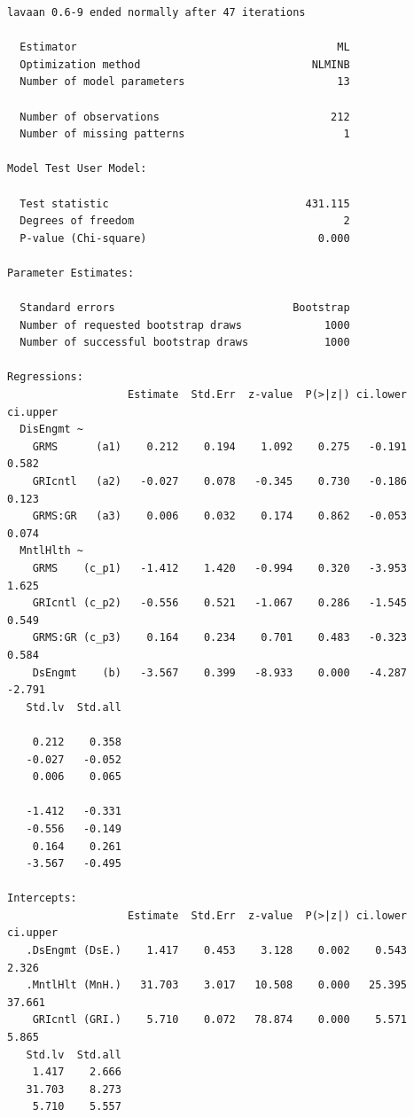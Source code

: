 \documentclass[
]{book}
\begin{document}
\begin{verbatim}
lavaan 0.6-9 ended normally after 47 iterations

  Estimator                                         ML
  Optimization method                           NLMINB
  Number of model parameters                        13
                                                      
  Number of observations                           212
  Number of missing patterns                         1
                                                      
Model Test User Model:
                                                      
  Test statistic                               431.115
  Degrees of freedom                                 2
  P-value (Chi-square)                           0.000

Parameter Estimates:

  Standard errors                            Bootstrap
  Number of requested bootstrap draws             1000
  Number of successful bootstrap draws            1000

Regressions:
                   Estimate  Std.Err  z-value  P(>|z|) ci.lower ci.upper
  DisEngmt ~                                                            
    GRMS      (a1)    0.212    0.194    1.092    0.275   -0.191    0.582
    GRIcntl   (a2)   -0.027    0.078   -0.345    0.730   -0.186    0.123
    GRMS:GR   (a3)    0.006    0.032    0.174    0.862   -0.053    0.074
  MntlHlth ~                                                            
    GRMS    (c_p1)   -1.412    1.420   -0.994    0.320   -3.953    1.625
    GRIcntl (c_p2)   -0.556    0.521   -1.067    0.286   -1.545    0.549
    GRMS:GR (c_p3)    0.164    0.234    0.701    0.483   -0.323    0.584
    DsEngmt    (b)   -3.567    0.399   -8.933    0.000   -4.287   -2.791
   Std.lv  Std.all
                  
    0.212    0.358
   -0.027   -0.052
    0.006    0.065
                  
   -1.412   -0.331
   -0.556   -0.149
    0.164    0.261
   -3.567   -0.495

Intercepts:
                   Estimate  Std.Err  z-value  P(>|z|) ci.lower ci.upper
   .DsEngmt (DsE.)    1.417    0.453    3.128    0.002    0.543    2.326
   .MntlHlt (MnH.)   31.703    3.017   10.508    0.000   25.395   37.661
    GRIcntl (GRI.)    5.710    0.072   78.874    0.000    5.571    5.865
   Std.lv  Std.all
    1.417    2.666
   31.703    8.273
    5.710    5.557


\end{verbatim}
\end{document}
